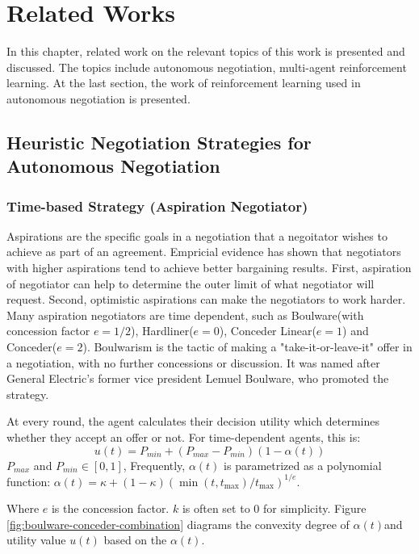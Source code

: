 \chapter{Related Works}
In this chapter, related work on the relevant topics of this work is presented and discussed. The topics include autonomous negotiation, multi-agent reinforcement learning. At the last section, the work of reinforcement learning used in autonomous negotiation is presented. 

\section{Heuristic Negotiation Strategies for Autonomous Negotiation} \label{related-work:heuristic-negotiation}
\subsection{Time-based Strategy (Aspiration Negotiator)}
Aspirations are the specific goals in a negotiation that a negoitator wishes to achieve as part of an agreement. Empricial evidence has shown that negotiators with higher aspirations tend to achieve better bargaining results. First, aspiration of negotiator can help to determine the outer limit of what negotiator will request. Second, optimistic aspirations can make the negotiators to work harder\parencite{Schneider2004}. Many aspiration negotiators are time dependent, such as Boulware(with concession factor $e=1/2$), Hardliner($e=0$), Conceder Linear($e=1$) and Conceder($e=2$)\parencite{FARATIN1998159}. Boulwarism is the tactic of making a "take-it-or-leave-it" offer in a negotiation, with no further concessions or discussion. It was named after General Electric's former vice president Lemuel Boulware, who promoted the strategy\parencite{William1991}.

At every round, the agent calculates their decision utility which determines whether they accept an offer or not. For time-dependent agents, this is:
\begin{equation}
u(t) = P_{min} + (P_{max} - P_{min})(1-\alpha(t))
\end{equation}
$P_{max}$ and $P_{min} \in [0, 1]$, Frequently, $\alpha(t)$ is parametrized as a polynomial function: $\alpha(t)=\kappa+\left(1-\kappa\right)\left(\min \left(t, t_{\max }\right) / t_{\max }\right)^{1 / e}$.

Where $e$ is the concession factor. $k$ is often set to 0 for simplicity. Figure \ref{fig:boulware-conceder-combination} diagrams the convexity degree of $\alpha(t)$and utility value $u(t)$ based on the $\alpha(t)$.

